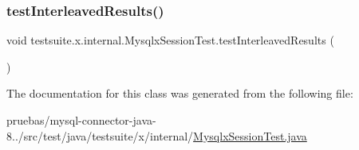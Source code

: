 \mbox{\label{classtestsuite_1_1x_1_1internal_1_1_mysqlx_session_test_a95056ffc22da5604859be3d0c9bd16fb}} 
\subsubsection{\texorpdfstring{test\+Interleaved\+Results()}{testInterleavedResults()}}
{\footnotesize\ttfamily void testsuite.\+x.\+internal.\+Mysqlx\+Session\+Test.\+test\+Interleaved\+Results (\begin{DoxyParamCaption}{ }\end{DoxyParamCaption})}



The documentation for this class was generated from the following file\+:\begin{DoxyCompactItemize}
\item 
pruebas/mysql-\/connector-\/java-\/8../src/test/java/testsuite/x/internal/\mbox{\hyperlink{_mysqlx_session_test_8java}{Mysqlx\+Session\+Test.\+java}}\end{DoxyCompactItemize}
